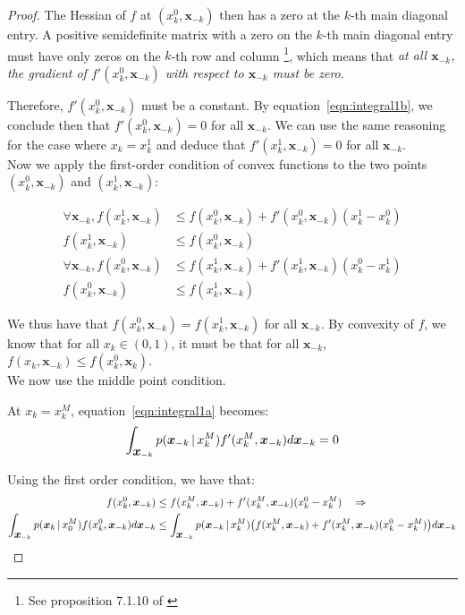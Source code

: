 \begin{proof}
The Hessian of $f$ at $(x^0_k, \mathbf{x}_{-k})$ then has a zero at the $k$-th main diagonal entry. A positive semidefinite matrix with a zero on the $k$-th main diagonal entry must have only zeros on the $k$-th row and column \footnote{ See proposition 7.1.10 of \citet{HJ90}}, which means that \emph{at all $\mathbf{x}_{-k}$, the gradient of $f'(x^0_k, \mathbf{x}_{-k})$ with respect to $\mathbf{x}_{-k}$ must be zero}.

Therefore, $f'(x_k^0, \mathbf{x}_{-k})$ must be a constant. By equation~\ref{eqn:integral1b}, we conclude then that $f'(x_k^0, \mathbf{x}_{-k}) = 0$ for all $\mathbf{x}_{-k}$. We can use the same reasoning for the case where $x_k = x_k^1$ and deduce that $f'(x^1_k, \mathbf{x}_{-k}) = 0$ for all $\mathbf{x}_{-k}$. \\

Now we apply the first-order condition of convex functions to the two points $(x^0_k, \mathbf{x}_{-k})$ and $(x^1_k, \mathbf{x}_{-k})$:

\begin{align*}
\forall \mathbf{x}_{-k}, f(x^1_k, \mathbf{x}_{-k}) & \leq f(x^0_k, \mathbf{x}_{-k}) 
  + f'(x^0_k, \mathbf{x}_{-k}) ( x^1_k - x^0_k) \\ 
f(x^1_k, \mathbf{x}_{-k}) &\leq f(x^0_k, \mathbf{x}_{-k}) \\
\forall \mathbf{x}_{-k}, f(x^0_k, \mathbf{x}_{-k}) & \leq f(x^1_k, \mathbf{x}_{-k}) 
  + f'(x^1_k, \mathbf{x}_{-k}) ( x^0_k - x^1_k) \\ 
f(x^0_k, \mathbf{x}_{-k}) &\leq f(x^1_k, \mathbf{x}_{-k})
\end{align*}

We thus have that $f(x^0_k, \mathbf{x}_{-k}) = f(x^1_k, \mathbf{x}_{-k})$ for all $\mathbf{x}_{-k}$. By convexity of $f$, we know that for all $x_k \in (0,1)$, it must be that for all $\mathbf{x}_{-k}$, $f(x_k, \mathbf{x}_{-k}) \leq f(x^0_k, \mathbf{x}_k)$.\\

We now use the middle point condition.

At $x_k = x^M_k$, equation~\ref{eqn:integral1a} becomes:
\begin{align}
\int_{\mbox{\boldmath $x$}_{-k}} p(\mbox{\boldmath $x$}_{-k} {\,|\,} x^M_k) 
  f'(x^M_k, \mbox{\boldmath $x$}_{-k}) d \mbox{\boldmath $x$}_{-k} = 0 \label{eqn:integral1c}
\end{align}

Using the first order condition, we have that:
\begin{align*}
f(x^0_k, \mbox{\boldmath $x$}_{-k}) &\leq f(x^M_k, \mbox{\boldmath $x$}_{-k}) 
+ f'(x^M_k, \mbox{\boldmath $x$}_{-k})(x^0_k - x^M_k)  \quad \Rightarrow \\
\int_{\mbox{\boldmath $x$}_{-k}} p(\mbox{\boldmath $x$}_k {\,|\,} x^M_0) 
f(x^0_k, \mbox{\boldmath $x$}_{-k}) d\mbox{\boldmath $x$}_{-k}  
&\leq \int_{\mbox{\boldmath $x$}_{-k}} p(\mbox{\boldmath $x$}_{-k} {\,|\,} x^M_k)
\big( f(x^M_k, \mbox{\boldmath $x$}_{-k}) 
+ f'(x^M_k, \mbox{\boldmath $x$}_{-k})(x^0_k - x^M_k) \big) d\mbox{\boldmath $x$}_{-k} 
\end{align*}


\end{proof}
